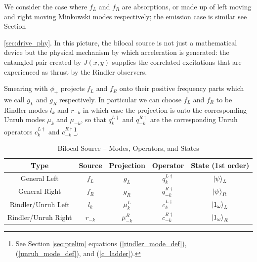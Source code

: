 \documentclass[12pt,a4paper]{article}
\begin{document}
We consider the case where $f_L$ and $f_R$ are absorptions, or made up of left moving and right moving Minkowski modes respectively; the emission case is similar see Section {\ref{sec:drive_phy}. In this picture, the bilocal source is not just a mathematical device but the physical mechanism by which acceleration is generated: the entangled pair created by $J(x,y)$ supplies the correlated excitations that are experienced as thrust by the Rindler observers.


Smearing with $\phi_+$ projects $f_L$ and $f_R$ onto their positive frequency parts which we call $g_L$ and $g_R$ respectively. In particular we can choose $f_L$ and $f_R$ to be Rindler modes $l_k$ and $r_{-k}$ in which case the projection is onto the corresponding Unruh modes $\mu_k$ and $\mu_{-k}$, so that $q_{k}^{L\dagger}$ and $q_{-k}^{R\dagger}$ are the corresponding Unruh operators $c_{k}^{L\dagger}$ and $c_{-k}^{R\dagger}$\footnote{See Section \ref{sec:prelim} equations (\ref{rindler_mode_def}), (\ref{unruh_mode_def}), and (\ref{c_ladder}).}.  

\begin{table}[ht]
\caption{Bilocal Source -- Modes, Operators, and States}
\centering
\begin{tabular}{c c c c c} %
\hline\hline
Type & Source & Projection & Operator & State (1st order)\\ [0.5ex] %
\hline %
General Left & $f_L$ & $g_L$ & $q_{k}^{L\dagger}$ & $\ket{\psi}_{L}$\\
General Right & $f_R$ & $g_R$ & $q_{-k}^{R\dagger}$  & $\ket{\psi}_{R}$\\
Rindler/Unruh Left & $l_{k}$ & $\mu_{k}^L$ & $c_{k}^{L\dagger}$ & $\ket{1_\omega}_{L}$\\
Rindler/Unruh Right & $r_{-k}$ & $\mu_{-k}^R$ & $c_{-k}^{R\dagger}$ & $\ket{1_\omega}_{R}$\\
\hline %
\end{tabular}
\label{table:modes}
\end{table}

}
\end{document}
